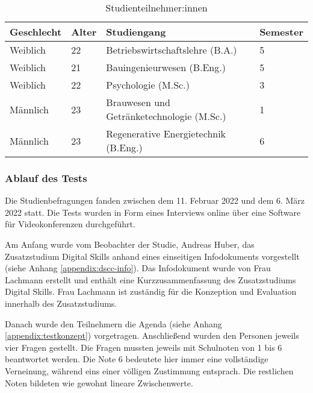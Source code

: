 \begin{table}[H]
\renewcommand*{\arraystretch}{1.6}
\centering
\begin{tabular}{|l|l|l|l|}
\hline
\textbf{Geschlecht} & \textbf{Alter} & \textbf{Studiengang}                      & \textbf{Semester} \\ \hline
Weiblich            & 22             & Betriebswirtschaftslehre (B.A.)           & 5                 \\ \hline
Weiblich            & 21             & Bauingenieurwesen (B.Eng.)                & 5                 \\ \hline
Weiblich            & 22             & Psychologie (M.Sc.)                       & 3                 \\ \hline
Männlich            & 23             & Brauwesen und Getränketechnologie (M.Sc.) & 1                 \\ \hline
Männlich            & 23             & Regenerative Energietechnik (B.Eng.)     & 6                 \\ \hline
\end{tabular}
\caption{Studienteilnehmer:innen}

\label{table:studie-teilnehmende}
\end{table}

\subsubsection{Ablauf des Tests}
Die Studienbefragungen fanden zwischen dem 11. Februar 2022 und dem 6. März 2022
statt. Die Tests wurden in Form eines Interviews online über eine Software für
Videokonferenzen durchgeführt.

Am Anfang wurde vom Beobachter der Studie, Andreas Huber, das Zusatzstudium
Digital Skills anhand eines einseitigen Infodokuments vorgestellt (siehe Anhang
\ref{appendix:dscc-info}). Das Infodokument wurde von Frau Lachmann erstellt und
enthält eine Kurzzusammenfassung des Zusatzstudiums Digital Skills. Frau
Lachmann ist zuständig für die Konzeption und Evaluation innerhalb des
Zusatzstudiums.

Danach wurde den Teilnehmern die Agenda (siehe Anhang
\ref{appendix:testkonzept}) vorgetragen. Anschließend wurden den Personen
jeweils vier Fragen gestellt. Die Fragen mussten jeweils mit Schulnoten
von 1 bis 6 beantwortet werden. Die Note 6 bedeutete hier immer eine
vollständige Verneinung, während eins einer völligen Zustimmung entsprach. Die
restlichen Noten bildeten wie gewohnt lineare Zwischenwerte.

